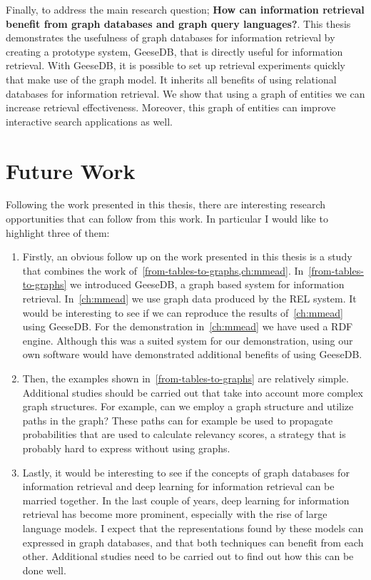 Finally, to address the main research question; \textbf{How can information retrieval benefit from graph databases and graph query languages?}. This thesis demonstrates the usefulness of graph databases for information retrieval by creating a prototype system, GeeseDB, that is directly useful for information retrieval. With GeeseDB, it is possible to set up retrieval experiments quickly that make use of the graph model. It inherits all benefits of using relational databases for information retrieval. We show that using a graph of entities we can increase retrieval effectiveness. Moreover, this graph of entities can improve interactive search applications as well.    

\section{Future Work}
Following the work presented in this thesis, there are interesting research opportunities that can follow from this work. In particular I would like to highlight three of them:
\begin{enumerate}
	\item Firstly, an obvious follow up on the work presented in this thesis is a study that combines the work of~\cref{from-tables-to-graphs,ch:mmead}. In~\cref{from-tables-to-graphs} we introduced GeeseDB, a graph based system for information retrieval. In~\cref{ch:mmead} we use graph data produced by the REL system. It would be interesting to see if we can reproduce the results of~\cref{ch:mmead} using GeeseDB. For the demonstration in~\cref{ch:mmead} we have used a RDF engine. Although this was a suited system for our demonstration, using our own software would have demonstrated additional benefits of using GeeseDB. 
	\item Then, the examples shown in~\cref{from-tables-to-graphs} are relatively simple. Additional studies should be carried out that take into account more complex graph structures. For example, can we employ a graph structure and utilize paths in the graph? These paths can for example be used to propagate probabilities that are used to calculate relevancy scores, a strategy that is probably hard to express without using graphs. 
	\item Lastly, it would be interesting to see if the concepts of graph databases for information retrieval and deep learning for information retrieval can be married together. In the last couple of years, deep learning for information retrieval has become more prominent, especially with the rise of large language models. I expect that the representations found by these models can expressed in graph databases, and that both techniques can benefit from each other. Additional studies need to be carried out to find out how this can be done well. 
\end{enumerate} 